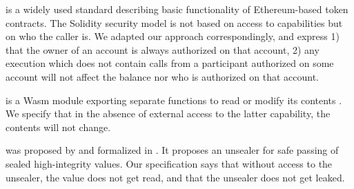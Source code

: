   is a widely used %
 standard describing  basic functionality of Ethereum-based token 
contracts. 
The Solidity security model is not based on access to  capabilities but on who the caller  is. 
We  adapted our approach correspondingly, and 
express 1) that  the owner of an account is always authorized on that account,  2) any execution which does not contain calls from a participant  authorized on some account will not affect the balance nor  who is authorized on  that account. 

 is a Wasm module exporting separate functions to read or modify its contents \cite{irisWasm23}. We specify that in the absence of external access to the latter capability, the contents will not change.  

 was proposed by \citet{JamesMorris} and formalized in \cite{ddd}. It proposes an unsealer for  safe passing of sealed high-integrity values. Our specification says that without access to the unsealer, the value does not get read, and that the unsealer does not get leaked.

